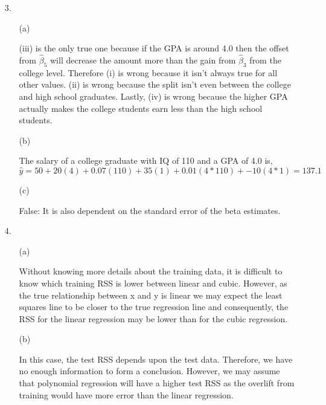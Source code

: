 \documentclass{article}
\begin{document}
\begin{enumerate}
    \begin{enumerate}
        \item[3. ] 
        
        \begin{enumerate}
            \item [(a)]
            
            (iii) is the only true one because if the GPA is around 4.0 then the offset from $\hat{\beta}_5$ will decrease the amount more than the gain from $\hat{\beta}_3$ from the college level. Therefore (i) is wrong because it isn't always true for all other values. (ii) is wrong because the split isn't even between the college and high school graduates. Lastly, (iv) is wrong because the higher GPA actually makes the college students earn less than the high school students.
            
            \item [(b)]
            
            The salary of a college graduate with IQ of 110 and a GPA of 4.0 is, $\hat{y} = 50 + 20(4) + 0.07 (110) + 35(1) + 0.01(4*110) + -10(4*1) = 137.1$
            
            \item [(c)]
            
            False: It is also dependent on the standard error of the beta estimates.
            
        \end{enumerate}
        
        \item[4. ]
        
        \begin{enumerate}
            \item [(a)]
            
            Without knowing more details about the training data, it is difficult to know which training RSS is lower between linear and cubic. However, as the true relationship between x and y is linear we may expect the least squares line to be closer to the true regression line and consequently, the RSS for the linear regression may be lower than for the cubic regression. 
            
            \item [(b)]
            
            In this case, the test RSS depends upon the test data. Therefore, we have no enough information to form a conclusion. However, we may assume that polynomial regression will have a higher test RSS as the overlift from training would have more error than the linear regression.
            

\end{enumerate}
\end{enumerate}
\end{enumerate}
\end{document}

